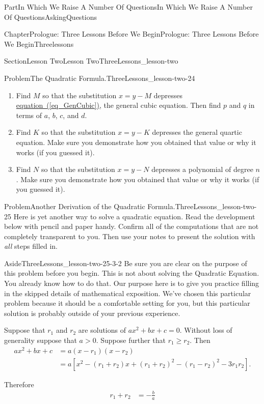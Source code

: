 \documentclass[oneside,10pt,]{book}
\newcommand{\xreffont}{\relax}
\numberwithin{equation}{part}
\newcommand{\amp}{&}
\begin{document}
\begin{partptx}{Part}{In Which We Raise A Number Of Questions}{}{In Which We Raise A Number Of Questions}{}{}{AskingQuestions}
\begin{chapterptx}{Chapter}{Prologue: Three Lessons Before We Begin}{}{Prologue: Three Lessons Before We Begin}{}{}{Threelessons}
\begin{sectionptx}{Section}{Lesson Two}{}{Lesson Two}{}{}{ThreeLessons_lesson-two}
\begin{problem}{Problem}{The Quadratic Formula.}{ThreeLessons_lesson-two-24}%
%
\begin{enumerate}[label={(\alph*)}]
\item{}Find \(M\) so that the substitution \(x=y-M\) depresses \hyperref[eq_GenCubic]{equation~({\xreffont\ref{eq_GenCubic}})}, the general cubic equation.  Then find \(p\) and \(q\) in terms of \(a\), \(b\), \(c\), and \(d\).%
\item{}Find \(K\) so that the substitution \(x=y-K\) depresses the general quartic equation.  Make sure you demonstrate how you obtained that value or why it works (if you guessed it).%
\item{}Find \(N\) so that the substitution \(x=y-N\) depresses a polynomial of degree \(n\).   Make sure you demonstrate how you obtained that value or why it works (if you guessed it).%
\end{enumerate}
%
\end{problem}
\begin{problem}{Problem}{Another Derivation of the Quadratic Formula.}{ThreeLessons_lesson-two-25}%
Here is yet another way to solve a quadratic equation.  Read the development below with pencil and paper handy.  Confirm all of the computations that are not completely transparent to you.  Then use your notes to present the solution with \emph{all} steps filled in.%
\begin{aside}{Aside}{}{ThreeLessons_lesson-two-25-3-2}%
Be sure you are clear on the purpose of this problem before you begin.  This is not about solving the Quadratic Equation.  You already know how to do that.  Our purpose here is to give you practice filling in the skipped details of mathematical exposition.  We've chosen this particular problem because it should be a comfortable setting for you, but this particular solution is probably outside of your previous experience.%
\end{aside}
Suppose that \(r_1\) and \(r_2\) are solutions of \(ax^2+bx+c=0\). Without loss of generality suppose that \(a>0\).  Suppose further that \(r_1\ge r_2\).  Then%
\begin{align*}
ax^2+bx+c \amp = a(x-r_1)(x-r_2)\\
\amp =
a\left[x^2-(r_1+r_2)x+(r_1+r_2)^2-(r_1-r_2)^2-3r_1r_2\right].
\end{align*}
%
\par
Therefore%
\begin{align}
r_1+r_2\amp = -\frac{b}{a}\label{eq_LagrangeQuadratic1}\\

\end{align}
\end{problem}
\end{sectionptx}
\end{chapterptx}
\end{partptx}
\end{document}
